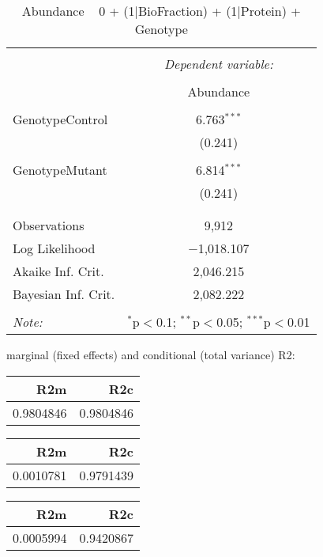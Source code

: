 \documentclass[11pt]{report}
\begin{document}
\begin{table}[!htbp] \centering 
  \caption{Abundance ~ 0 + (1|BioFraction) + (1|Protein) + Genotype} 
  \label{} 
\begin{tabular}{@{\extracolsep{5pt}}lc} 
\\[-1.8ex]\hline 
\hline \\[-1.8ex] 
 & \multicolumn{1}{c}{\textit{Dependent variable:}} \\ 
\cline{2-2} 
\\[-1.8ex] & Abundance \\ 
\hline \\[-1.8ex] 
 GenotypeControl & 6.763$^{***}$ \\ 
  & (0.241) \\ 
  & \\ 
 GenotypeMutant & 6.814$^{***}$ \\ 
  & (0.241) \\ 
  & \\ 
\hline \\[-1.8ex] 
Observations & 9,912 \\ 
Log Likelihood & $-$1,018.107 \\ 
Akaike Inf. Crit. & 2,046.215 \\ 
Bayesian Inf. Crit. & 2,082.222 \\ 
\hline 
\hline \\[-1.8ex] 
\textit{Note:}  & \multicolumn{1}{r}{$^{*}$p$<$0.1; $^{**}$p$<$0.05; $^{***}$p$<$0.01} \\ 
\end{tabular} 
\end{table} 
marginal (fixed effects) and conditional (total variance) R2:

\begin{tabular}{r|r}
\hline
R2m & R2c\\
\hline
0.9804846 & 0.9804846\\
\hline
\end{tabular}

\begin{tabular}{r|r}
\hline
R2m & R2c\\
\hline
0.0010781 & 0.9791439\\
\hline
\end{tabular}

\begin{tabular}{r|r}
\hline
R2m & R2c\\
\hline
0.0005994 & 0.9420867\\
\hline
\end{tabular}
\end{document}
